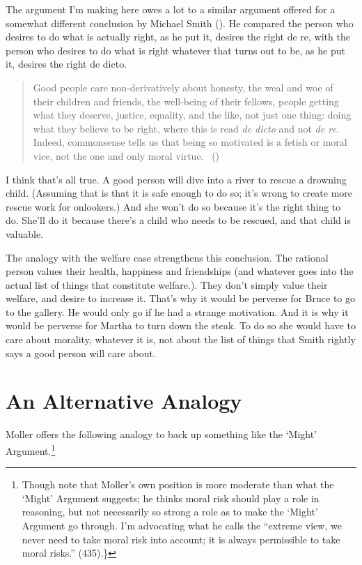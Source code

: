 \documentclass[
  10pt,
  letterpaper,
  DIV=11,
  numbers=noendperiod,
  twoside]{scrartcl}
\begin{document}
The argument I'm making here owes a lot to a similar argument offered
for a somewhat different conclusion by Michael Smith
(). He compared the person who desires to
do what is actually right, as he put it, desires the right de re, with
the person who desires to do what is right whatever that turns out to
be, as he put it, desires the right de dicto.

\begin{quote}
Good people care non-derivatively about honesty, the weal and woe of
their children and friends, the well-being of their fellows, people
getting what they deserve, justice, equality, and the like, not just one
thing: doing what they believe to be right, where this is read \emph{de
dicto} and not \emph{de re}. Indeed, commonsense tells us that being so
motivated is a fetish or moral vice, not the one and only moral virtue.
~()
\end{quote}

I think that's all true. A good person will dive into a river to rescue
a drowning child. (Assuming that is that it is safe enough to do so;
it's wrong to create more rescue work for onlookers.) And she won't do
so because it's the right thing to do. She'll do it because there's a
child who needs to be rescued, and that child is valuable.

The analogy with the welfare case strengthens this conclusion. The
rational person values their health, happiness and friendships (and
whatever goes into the actual list of things that constitute welfare.).
They don't simply value their welfare, and desire to increase it. That's
why it would be perverse for Bruce to go to the gallery. He would only
go if he had a strange motivation. And it is why it would be perverse
for Martha to turn down the steak. To do so she would have to care about
morality, whatever it is, not about the list of things that Smith
rightly says a good person will care about.

\section{An Alternative Analogy}\label{analternativeanalogy}

Moller offers the following analogy to back up something like the
`Might' Argument.\footnote{Though note that Moller's own position is
  more moderate than what the `Might' Argument suggests; he thinks moral
  risk should play a role in reasoning, but not necessarily so strong a
  role as to make the `Might' Argument go through. I'm advocating what
  he calls the ``extreme view, we never need to take moral risk into
  account; it is always permissible to take moral risks.'' (435).\}}
\end{document}
